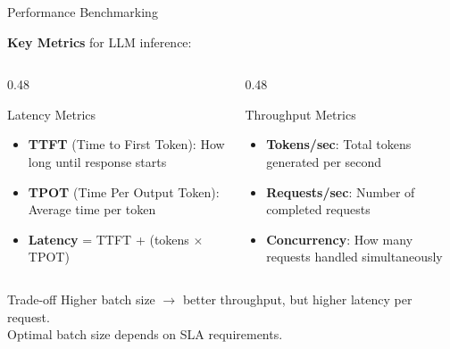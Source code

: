 \documentclass[aspectratio=169, 11pt]{beamer}
\begin{document}
\begin{frame}{Performance Benchmarking}

	\textbf{Key Metrics} for LLM inference:

	\begin{columns}[T]
		\begin{column}{0.48\textwidth}
			\begin{block}{Latency Metrics}
				\begin{itemize}
					\item \textbf{TTFT} (Time to First Token): How long until response starts
					\item \textbf{TPOT} (Time Per Output Token): Average time per token
					\item \textbf{Latency} = TTFT + (tokens $\times$ TPOT)
				\end{itemize}
			\end{block}
		\end{column}
		\begin{column}{0.48\textwidth}
			\begin{block}{Throughput Metrics}
				\begin{itemize}
					\item \textbf{Tokens/sec}: Total tokens generated per second
					\item \textbf{Requests/sec}: Number of completed requests
					\item \textbf{Concurrency}: How many requests handled simultaneously
				\end{itemize}
			\end{block}
		\end{column}
	\end{columns}

	\begin{alertblock}{Trade-off}
		Higher batch size $\rightarrow$ better throughput, but higher latency per request.\\
		Optimal batch size depends on SLA requirements.
	\end{alertblock}

\end{frame}
\end{document}
